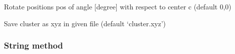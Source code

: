 \documentclass[letterpaper,10pt,english]{sphinxmanual}
\begin{document}
\begin{fulllineitems}
\label{\detokenize{tool_create_cluster:tool_create_cluster.rotate}}
\pysigstartsignatures
{}
\pysigstopsignatures
\sphinxAtStartPar
Rotate positions pos of angle {[}degree{]} with respect to center c (default 0,0)

\end{fulllineitems}


\begin{fulllineitems}
\label{\detokenize{tool_create_cluster:tool_create_cluster.save_xyz}}
\pysigstartsignatures
{}
\pysigstopsignatures
\sphinxAtStartPar
Save cluster as xyz in given file (default ‘cluster.xyz’)

\end{fulllineitems}


\sphinxstepscope


\subsubsection{String method}
\label{\detokenize{string_method:module-string_method}}\label{\detokenize{string_method:string-method}}\label{\detokenize{string_method::doc}}
\end{document}
